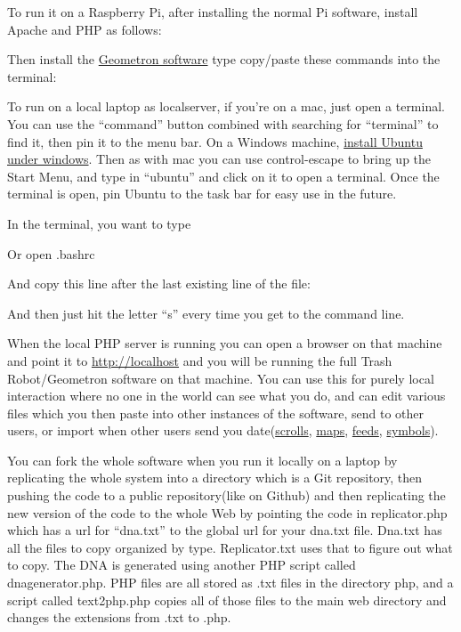 To run it on a Raspberry Pi, after installing the normal Pi software,
install Apache and PHP as follows:

Then install the \href{https://github.com/lafelabs/thing/}{Geometron
software} type copy/paste these commands into the terminal:

To run on a local laptop as localserver, if you're on a mac, just open a
terminal. You can use the ``command'' button combined with searching for
``terminal'' to find it, then pin it to the menu bar. On a Windows
machine,
\href{https://ubuntu.com/tutorials/ubuntu-on-windows\#1-overview}{install
Ubuntu under windows}. Then as with mac you can use control-escape to
bring up the Start Menu, and type in ``ubuntu'' and click on it to open
a terminal. Once the terminal is open, pin Ubuntu to the task bar for
easy use in the future.

In the terminal, you want to type

Or open .bashrc

And copy this line after the last existing line of the file:

And then just hit the letter ``s'' every time you get to the command
line.

When the local PHP server is running you can open a browser on that
machine and point it to \href{http://localhost/}{http://localhost} and
you will be running the full Trash Robot/Geometron software on that
machine. You can use this for purely local interaction where no one in
the world can see what you do, and can edit various files which you then
paste into other instances of the software, send to other users, or
import when other users send you
date(\href{scrolls/scrolls.md}{scrolls}, \href{scrolls/maps.md}{maps},
\href{scrolls/feeds.md}{feeds}, \href{scrolls/geometron.md}{symbols}).

You can fork the whole software when you run it locally on a laptop by
replicating the whole system into a directory which is a Git repository,
then pushing the code to a public repository(like on Github) and then
replicating the new version of the code to the whole Web by pointing the
code in replicator.php which has a url for ``dna.txt'' to the global url
for your dna.txt file. Dna.txt has all the files to copy organized by
type. Replicator.txt uses that to figure out what to copy. The DNA is
generated using another PHP script called dnagenerator.php. PHP files
are all stored as .txt files in the directory php, and a script called
text2php.php copies all of those files to the main web directory and
changes the extensions from .txt to .php.

